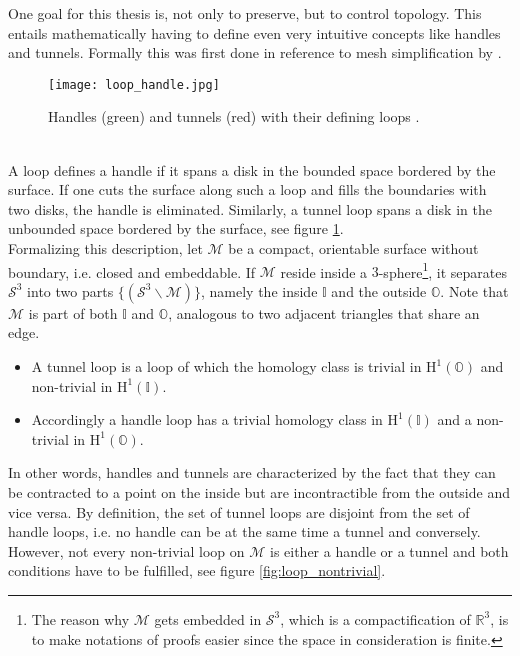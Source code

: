 One goal for this thesis is, not only to preserve, but to control topology.
This entails mathematically having to define even very intuitive concepts like handles and tunnels.
Formally this was first done in reference to mesh simplification by \citep[][]{Dey2007}.
\begin{figure}[htb]
\centering
\texttt{[image: loop\_handle.jpg]}
\caption{Handles (green) and tunnels (red) with their defining loops \citep[][]{Dey2012}.}
\label{fig:loop_handle}
\end{figure}\\
A loop defines a handle if it spans a disk in the bounded space bordered by the surface.
If one cuts the surface along such a loop and fills the boundaries with two disks, the handle is eliminated.
Similarly, a tunnel loop spans a disk in the unbounded space bordered by the surface, see figure \ref{fig:loop_handle}.\\
Formalizing this description, let $\mathcal{M}$ be a compact, orientable surface without boundary, i.e. closed and embeddable.
If $\mathcal{M}$ reside inside a $3$-sphere\footnote{ The reason why $\mathcal{M}$ gets embedded in $\mathcal{S}^{3}$, which is a compactification of $\mathbb{R}^{3}$, is to make notations of proofs easier since the space in consideration is finite.}, it separates $\mathcal{S}^{3}$ into two parts $\{(\mathcal{S}^{3} \backslash \mathcal{M})\}$, namely the inside $\mathbb{I}$ and the outside $\mathbb{O}$.
Note that $\mathcal{M}$ is part of both $\mathbb{I}$ and $\mathbb{O}$, analogous to two adjacent triangles that share an edge.
\begin{itemize}
\setlength{\itemsep}{0cm}
\setlength{\parskip}{0cm}
	\item A tunnel loop is a loop of which the homology class is trivial in $\mathrm{H}^{1}(\mathbb{O})$ and non-trivial in $\mathrm{H}^{1}(\mathbb{I})$.
	\item Accordingly a handle loop has a trivial homology class in $\mathrm{H}^{1}(\mathbb{I})$ and a non-trivial in $\mathrm{H}^{1}(\mathbb{O})$.
\end{itemize}

In other words, handles and tunnels are characterized by the fact that they can be contracted to a point on the inside but are incontractible from the outside and vice versa.
By definition, the set of tunnel loops are disjoint from the set of handle loops, i.e. no handle can be at the same time a tunnel and conversely.
However, not every non-trivial loop on $\mathcal{M}$ is either a handle or a tunnel and both conditions have to be fulfilled, see figure \ref{fig:loop_nontrivial}.

